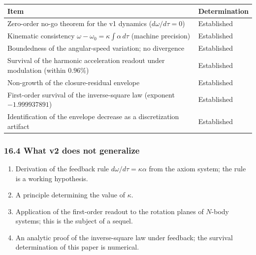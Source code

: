 \documentclass[
  a4paper,
]{article}
\newcounter{none} %
\providecommand{\tightlist}{%
  \setlength{\itemsep}{0pt}\setlength{\parskip}{0pt}}
\begin{document}
{\def\LTcaptype{none} %
\begin{longtable}[]{@{}
  >{\raggedright\arraybackslash}p{}
  >{\raggedright\arraybackslash}p{}@{}}
\toprule\noalign{}
\begin{minipage}[b]{\linewidth}\raggedright
Item
\end{minipage} & \begin{minipage}[b]{\linewidth}\raggedright
Determination
\end{minipage} \\
\midrule\noalign{}
\endhead
\bottomrule\noalign{}
\endlastfoot
Zero-order no-go theorem for the v1 dynamics (\(d\omega/d\tau=0\)) &
Established \\
Kinematic consistency \(\omega-\omega_0=\kappa\int\alpha\,d\tau\)
(machine precision) & Established \\
Boundedness of the angular-speed variation; no divergence &
Established \\
Survival of the harmonic acceleration readout under modulation (within
\(0.96\%\)) & Established \\
Non-growth of the closure-residual envelope & Established \\
First-order survival of the inverse-square law (exponent
\(-1.999937891\)) & Established \\
Identification of the envelope decrease as a discretization artifact &
Established \\
\end{longtable}
}

\subsubsection{16.4 What v2 does not
generalize}\label{what-v2-does-not-generalize}

\begin{enumerate}
\def\labelenumi{\arabic{enumi}.}
\tightlist
\item
  Derivation of the feedback rule \(d\omega/d\tau=\kappa\alpha\) from
  the axiom system; the rule is a working hypothesis.
\item
  A principle determining the value of \(\kappa\).
\item
  Application of the first-order readout to the rotation planes of
  \(N\)-body systems; this is the subject of a sequel.
\item
  An analytic proof of the inverse-square law under feedback; the
  survival determination of this paper is numerical.
\end{enumerate}
\end{document}
